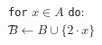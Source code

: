 \documentclass[preview]{standalone}
\begin{document}
\begin{center}
\texttt{for} $x \in A$ \texttt{do}:\\ \t $B \leftarrow B \cup \{2 \cdot x\}$
\end{center}
\end{document}
